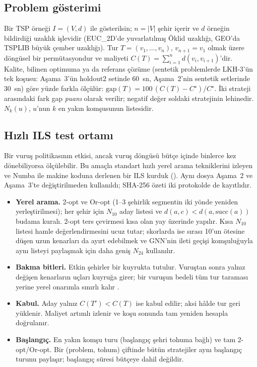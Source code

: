 \documentclass[pdflatex,sn-basic]{sn-jnl}
\begin{document}
\subsection{Problem gösterimi}\label{sec:yontem-problem}

Bir TSP örneği $I=(V,d)$ ile gösterilsin; $n=|V|$ şehir içerir ve $d$ örneğin bildirdiği uzaklık
işlevidir (EUC\_2D'de yuvarlatılmış Öklid uzaklığı, GEO'da TSPLIB büyük çember uzaklığı). Tur
$T=(v_1,\dots,v_n)$, $v_{n+1}=v_1$ olmak üzere döngüsel bir permütasyondur ve maliyeti
$C(T)=\sum_{i=1}^{n} d(v_i,v_{i+1})$'dir. Kalite, bilinen optimuma ya da referans çözüme (sentetik problemlerde LKH-3'ün tek koşusu:
Aşama~3'ün holdout2 setinde 60~sn, Aşama~2'nin sentetik setlerinde 30~sn) göre yüzde farkla ölçülür: $\mathrm{gap}(T)=100\,(C(T)-C^\star)/C^\star$. İki strateji arasındaki fark gap
\emph{puanı} olarak verilir; negatif değer soldaki stratejinin lehinedir. $N_k(u)$, $u$'nun $k$
en yakın komşusunun listesidir.

\subsection{Hızlı ILS test ortamı}\label{sec:yontem-hizli}

Bir vuruş politikasının etkisi, ancak vuruş döngüsü bütçe içinde binlerce kez dönebiliyorsa
ölçülebilir. Bu amaçla standart hızlı yerel arama tekniklerini \citep{bentley_1992_fast,
johnson_1997_case} izleyen ve Numba ile makine koduna derlenen bir ILS kurduk ().
Aynı dosya Aşama~2 ve Aşama~3'te değiştirilmeden kullanıldı; SHA-256 özeti iki protokolde de
kayıtlıdır.

\begin{itemize}
  \item \textbf{Yerel arama.} 2-opt ve Or-opt (1--3 şehirlik segmentin iki yönde yeniden
  yerleştirilmesi); her şehir için $N_{10}$ aday listesi ve $d(a,c)<d(a,\mathrm{succ}(a))$ budama
  kuralı. 2-opt ters çevirmesi kısa olan yay üzerinde yapılır. Kısa $N_{10}$ listesi hamle
  değerlendirmesini ucuz tutar; skorlarda ise sırası 10'un ötesine düşen uzun kenarları da
  ayırt edebilmek ve GNN'nin ileti geçişi komşuluğuyla aynı listeyi paylaşmak için daha geniş
  $N_{24}$ kullanılır.
  \item \textbf{Bakma bitleri.} Etkin şehirler bir kuyrukta tutulur. Vuruştan sonra yalnız değişen
  kenarların uçları kuyruğa girer; bir vuruşun bedeli tüm tur taraması yerine yerel onarımla
  sınırlı kalır \citep{bentley_1992_fast}.
  \item \textbf{Kabul.} Aday yalnız $C(T')<C(T)$ ise kabul edilir; aksi hâlde tur geri yüklenir.
  Maliyet artımlı izlenir ve koşu sonunda tam yeniden hesapla doğrulanır.
  \item \textbf{Başlangıç.} En yakın komşu turu (başlangıç şehri tohuma bağlı) ve tam 2-opt/Or-opt.
  Bir (problem, tohum) çiftinde bütün stratejiler aynı başlangıç turunu paylaşır; başlangıç süresi
  bütçeye dahil değildir.
\end{itemize}
\end{document}
